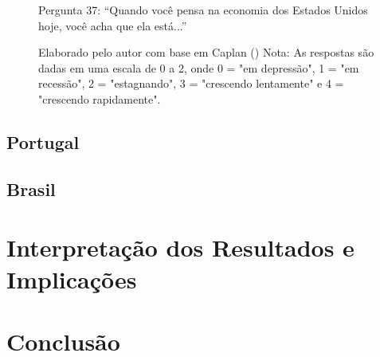 \begin{figure}[H]
    \centering
    \caption*{Pergunta 37: “Quando você pensa na economia dos Estados Unidos hoje, você acha que ela está...”}
    \caption{Elaborado pelo autor com base em Caplan (\citeyear{The_Myth_of_the_Rational_Voter}) \newline
    Nota: As respostas são dadas em uma escala de 0 a 2, onde 0 = "em depressão", 1 = "em recessão", 2 = "estagnando", 3 = "crescendo lentamente" e 4 = "crescendo rapidamente".}
    \label{fig:pergunta_37}
\end{figure}

\newpage

\subsection{Portugal}

\subsection{Brasil}


\section{Interpretação dos Resultados e Implicações}

\section{Conclusão}

